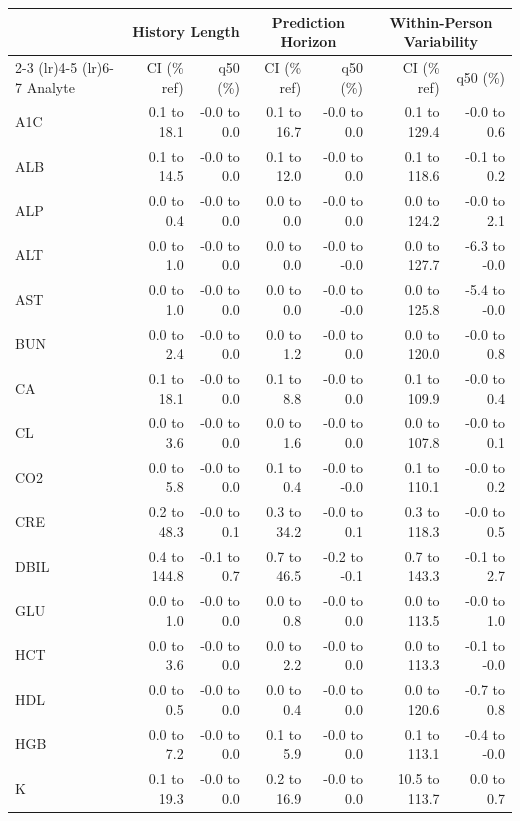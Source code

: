 \begin{table}[ht]
\centering
\footnotesize
\begin{tabular}{lrrrrrr}
\toprule
  & \multicolumn{2}{c}{History Length} & \multicolumn{2}{c}{Prediction Horizon} & \multicolumn{2}{c}{Within-Person Variability} \\
\cmidrule(lr){2-3} \cmidrule(lr){4-5} \cmidrule(lr){6-7}
Analyte & CI (\% ref) & q50 (\%) & CI (\% ref) & q50 (\%) & CI (\% ref) & q50 (\%) \\
\midrule
A1C & 0.1 to 18.1 & -0.0 to 0.0 & 0.1 to 16.7 & -0.0 to 0.0 & 0.1 to 129.4 & -0.0 to 0.6 \\
ALB & 0.1 to 14.5 & -0.0 to 0.0 & 0.1 to 12.0 & -0.0 to 0.0 & 0.1 to 118.6 & -0.1 to 0.2 \\
ALP & 0.0 to 0.4 & -0.0 to 0.0 & 0.0 to 0.0 & -0.0 to 0.0 & 0.0 to 124.2 & -0.0 to 2.1 \\
ALT & 0.0 to 1.0 & -0.0 to 0.0 & 0.0 to 0.0 & -0.0 to -0.0 & 0.0 to 127.7 & -6.3 to -0.0 \\
AST & 0.0 to 1.0 & -0.0 to 0.0 & 0.0 to 0.0 & -0.0 to -0.0 & 0.0 to 125.8 & -5.4 to -0.0 \\
BUN & 0.0 to 2.4 & -0.0 to 0.0 & 0.0 to 1.2 & -0.0 to 0.0 & 0.0 to 120.0 & -0.0 to 0.8 \\
CA & 0.1 to 18.1 & -0.0 to 0.0 & 0.1 to 8.8 & -0.0 to 0.0 & 0.1 to 109.9 & -0.0 to 0.4 \\
CL & 0.0 to 3.6 & -0.0 to 0.0 & 0.0 to 1.6 & -0.0 to 0.0 & 0.0 to 107.8 & -0.0 to 0.1 \\
CO2 & 0.0 to 5.8 & -0.0 to 0.0 & 0.1 to 0.4 & -0.0 to -0.0 & 0.1 to 110.1 & -0.0 to 0.2 \\
CRE & 0.2 to 48.3 & -0.0 to 0.1 & 0.3 to 34.2 & -0.0 to 0.1 & 0.3 to 118.3 & -0.0 to 0.5 \\
DBIL & 0.4 to 144.8 & -0.1 to 0.7 & 0.7 to 46.5 & -0.2 to -0.1 & 0.7 to 143.3 & -0.1 to 2.7 \\
GLU & 0.0 to 1.0 & -0.0 to 0.0 & 0.0 to 0.8 & -0.0 to 0.0 & 0.0 to 113.5 & -0.0 to 1.0 \\
HCT & 0.0 to 3.6 & -0.0 to 0.0 & 0.0 to 2.2 & -0.0 to 0.0 & 0.0 to 113.3 & -0.1 to -0.0 \\
HDL & 0.0 to 0.5 & -0.0 to 0.0 & 0.0 to 0.4 & -0.0 to 0.0 & 0.0 to 120.6 & -0.7 to 0.8 \\
HGB & 0.0 to 7.2 & -0.0 to 0.0 & 0.1 to 5.9 & -0.0 to 0.0 & 0.1 to 113.1 & -0.4 to -0.0 \\
K & 0.1 to 19.3 & -0.0 to 0.0 & 0.2 to 16.9 & -0.0 to 0.0 & 10.5 to 113.7 & 0.0 to 0.7 \\

\end{tabular}
\end{table}
